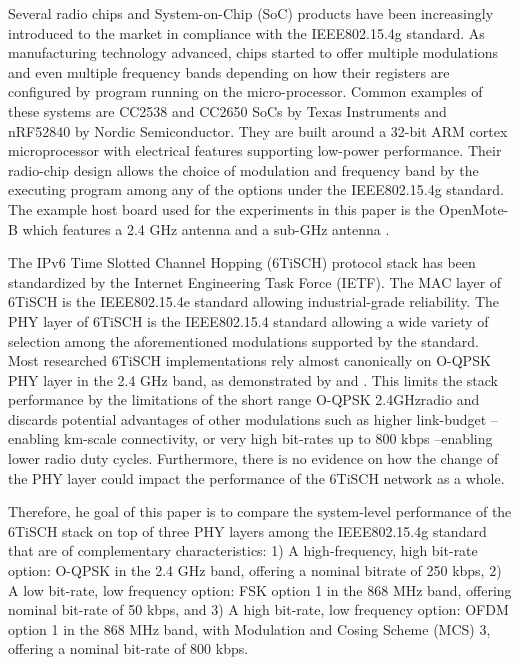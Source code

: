 \documentclass[journal]{IEEEtran}
\newcommand{\oqpsk}        {O-QPSK 2.4GHz}
\newcommand{\lorem}        {\textcolor{green}{Lorem ipsum dolor sit amet, consectetur adipiscing elit, sed do eiusmod tempor incididunt ut labore et dolore magna aliqua. Ut enim ad minim veniam, quis nostrud exercitation ullamco laboris nisi ut aliquip ex ea commodo consequat. Duis aute irure dolor in reprehenderit in voluptate velit esse cillum dolore eu fugiat nulla pariatur. Excepteur sint occaecat cupidatat non proident, sunt in culpa qui officia deserunt mollit anim id est laborum.}}
\begin{document}

Several radio chips and System-on-Chip (SoC) products have been increasingly introduced to the market in compliance with the IEEE802.15.4g standard. 
As manufacturing technology advanced, chips started to offer multiple modulations and even multiple frequency bands depending on how their registers are configured by program running on the micro-processor.
Common examples of these systems are CC2538 \cite{12cc2538} and CC2650 \cite{15cc2650} SoCs by Texas Instruments and nRF52840 \cite{19nrf52840} by Nordic Semiconductor. 
They are built around a 32-bit ARM cortex microprocessor with electrical features supporting low-power performance.
Their radio-chip design allows the choice of modulation and frequency band by the executing program among any of the options under the IEEE802.15.4g standard. 
The example host board used for the experiments in this paper is the OpenMote-B which features a 2.4 GHz antenna and a sub-GHz antenna \cite{tusetopenmote}.

The IPv6 Time Slotted Channel Hopping (6TiSCH) protocol stack has been  standardized by the Internet Engineering Task Force (IETF).
The MAC layer of 6TiSCH is the IEEE802.15.4e standard allowing industrial-grade reliability.
The PHY layer of 6TiSCH is the IEEE802.15.4 standard allowing a wide variety of selection among the aforementioned modulations supported by the standard.
Most researched 6TiSCH implementations rely almost canonically on O-QPSK PHY layer in the 2.4 GHz band, as demonstrated by \cite{j.munoz18problem} and \cite{brachmann19ieee}.
This limits the stack performance by the limitations of the short range \oqpsk  radio and discards potential advantages of other modulations such as higher link-budget --enabling km-scale connectivity, or very high bit-rates up to 800 kbps --enabling lower radio duty cycles.
Furthermore, there is no evidence on how the change of the PHY layer could impact the performance of the 6TiSCH network as a whole. 

Therefore, he goal of this paper is to compare the system-level performance of the 6TiSCH stack on top of three PHY layers among the IEEE802.15.4g standard that are of complementary characteristics: 
     1) A high-frequency, high bit-rate option: O-QPSK in the 2.4 GHz band, offering a nominal bitrate of 250 kbps,
     2) A low bit-rate, low frequency option: FSK option 1 in the 868 MHz band, offering nominal bit-rate of 50 kbps, and 
     3) A high bit-rate, low frequency option: OFDM option 1  in the 868 MHz band, with Modulation and Cosing Scheme (MCS) 3, offering a nominal bit-rate of 800 kbps. 
\end{document}

